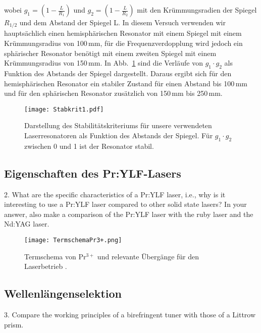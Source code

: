wobei $g_1=(1-\frac{L}{R_1})$ und $g_2=(1-\frac{L}{R_2})$ mit den Krümmungsradien der Spiegel $R_{1/2}$ und dem Abstand der Spiegel L. In diesem Versuch verwenden wir hauptsächlich einen hemisphärischen Resonator mit einem Spiegel mit einem Krümmungsradius
von 100\,mm, für die Frequenzverdopplung wird jedoch ein sphärischer Resonator benötigt mit 
einem zweiten Spiegel mit einem Krümmungsradius von 150\,mm.
In Abb.~\ref{img:stabkrit} sind die Verläufe von $g_1 \cdot g_2$ als Funktion des Abstands der Spiegel dargestellt. Daraus ergibt sich für den hemisphärischen Resonator ein stabiler Zustand für einen Abstand bis 100\,mm und für den sphärischen Resonator zusätzlich von 150\,mm bis 250\,mm.

\begin{figure}[H]
\begin{center}
  \texttt{[image: Stabkrit1.pdf]}
  \caption{Darstellung des Stabilitätskriteriums für unsere verwendeten Laserresonatoren als Funktion des Abstands der Spiegel. Für $g_1\cdot g_2$ zwischen 0 und 1 ist der Resonator stabil.}
  \label{img:stabkrit}
\end{center}
\end{figure}


\subsection{Eigenschaften des Pr:YLF-Lasers}

2. What are the specific characteristics of a Pr:YLF laser, i.e., why is it interesting to use a Pr:YLF
laser compared to other solid state lasers? In your answer, also make a comparison of the Pr:YLF
laser with the ruby laser and the Nd:YAG laser.

\begin{figure}[H]
\begin{center}
  \texttt{[image: TermschemaPr3+.png]}
  \caption{Termschema von Pr$^{3+}$ und relevante Übergänge für den Laserbetrieb
  \cite{Versuchsanleitung}.}
  \label{img:Termschema}
\end{center}
\end{figure}

\subsection{Wellenlängenselektion}


3. Compare the working principles of a birefringent tuner with those of a Littrow prism.


